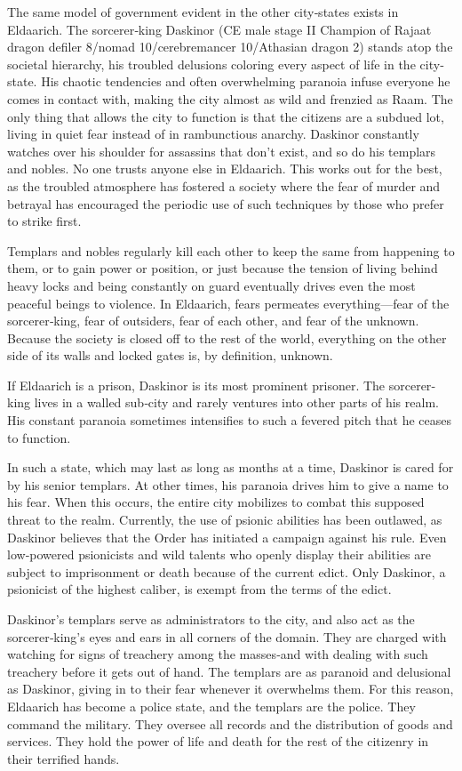 {
	The same model of government evident in the other city‐states exists in Eldaarich. The sorcerer‐king Daskinor (CE male stage II Champion of Rajaat dragon defiler 8/nomad 10/cerebremancer 10/Athasian dragon 2) stands atop the societal hierarchy, his troubled delusions coloring every aspect of life in the city‐state. His chaotic tendencies and often overwhelming paranoia infuse everyone he comes in contact with, making the city almost as wild and frenzied as Raam. The only thing that allows the city to function is that the citizens are a subdued lot, living in quiet fear instead of in rambunctious anarchy. Daskinor constantly watches over his shoulder for assassins that don’t exist, and so do his templars and nobles. No one trusts anyone else in Eldaarich. This works out for the best, as the troubled atmosphere has fostered a society where the fear of murder and betrayal has encouraged the periodic use of such techniques by those who prefer to strike first.

	Templars and nobles regularly kill each other to keep the same from happening to them, or to gain power or position, or just because the tension of living behind heavy locks and being constantly on guard eventually drives even the most peaceful beings to violence. In Eldaarich, fears permeates everything---fear of the sorcerer‐king, fear of outsiders, fear of each other, and fear of the unknown. Because the society is closed off to the rest of the world, everything on the other side of its walls and locked gates is, by definition, unknown.

	If Eldaarich is a prison, Daskinor is its most prominent prisoner. The sorcerer‐king lives in a walled sub‐city and rarely ventures into other parts of his realm. His constant paranoia sometimes intensifies to such a fevered pitch that he ceases to function.

	In such a state, which may last as long as months at a time, Daskinor is cared for by his senior templars. At other times, his paranoia drives him to give a name to his fear. When this occurs, the entire city mobilizes to combat this supposed threat to the realm. Currently, the use of psionic abilities has been outlawed, as Daskinor believes that the Order has initiated a campaign against his rule. Even low‐powered psionicists and wild talents who openly display their abilities are subject to imprisonment or death because of the current edict. Only Daskinor, a psionicist of the highest caliber, is exempt from the terms of the edict.

	Daskinor’s templars serve as administrators to the city, and also act as the sorcerer‐king’s eyes and ears in all corners of the domain. They are charged with watching for signs of treachery among the masses‐and with dealing with such treachery before it gets out of hand. The templars are as paranoid and delusional as Daskinor, giving in to their fear whenever it overwhelms them. For this reason, Eldaarich has become a police state, and the templars are the police. They command the military. They oversee all records and the distribution of goods and services. They hold the power of life and death for the rest of the citizenry in their terrified hands.
}

